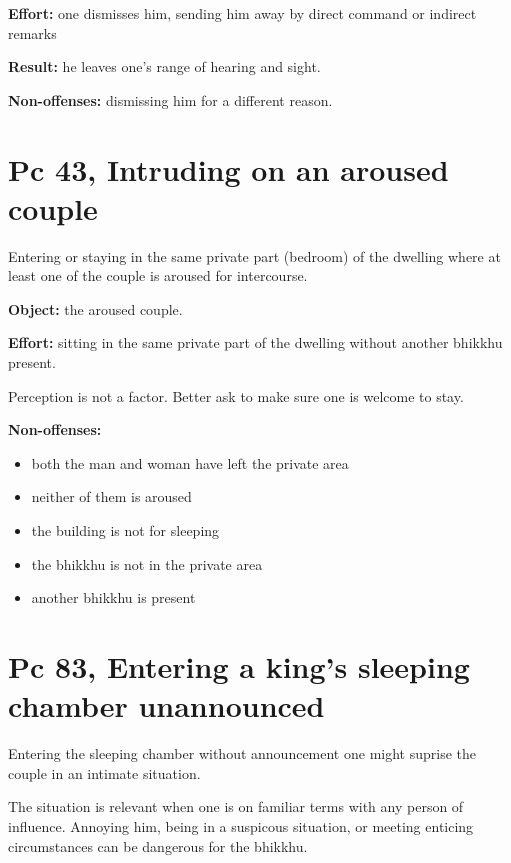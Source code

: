\textbf{Effort:} one dismisses him, sending him away by direct command
or indirect remarks

\textbf{Result:} he leaves one's range of hearing and sight.

\textbf{Non-offenses:} dismissing him for a different reason.

\section{Pc 43, Intruding on an aroused couple}

\begin{multicols}{2}

Entering or staying in the same private part (bedroom) of the dwelling
where at least one of the couple is aroused for intercourse.

\textbf{Object:} the aroused couple.

\textbf{Effort:} sitting in the same private part of the dwelling
without another bhikkhu present.

Perception is not a factor. Better ask to make sure one is welcome to
stay.

\columnbreak

\textbf{Non-offenses:}

\begin{itemize}
\tightlist
\item
  both the man and woman have left the private area
\item
  neither of them is aroused
\item
  the building is not for sleeping
\item
  the bhikkhu is not in the private area
\item
  another bhikkhu is present
\end{itemize}

\end{multicols}

\section{Pc 83, Entering a king's sleeping chamber unannounced}

Entering the sleeping chamber without announcement one might suprise the
couple in an intimate situation.

The situation is relevant when one is on familiar terms with any person
of influence. Annoying him, being in a suspicous situation, or meeting
enticing circumstances can be dangerous for the bhikkhu.

